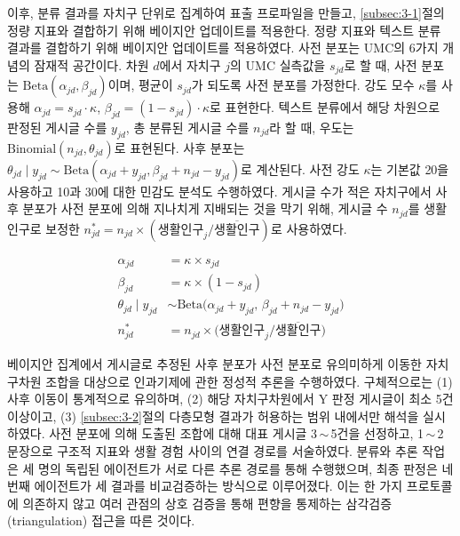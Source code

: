 
이후, 분류 결과를 자치구 단위로 집계하여 표출 프로파일을 만들고, \ref{subsec:3-1}절의 정량 지표와 결합하기 위해 베이지안 업데이트를 적용한다. 정량 지표와 텍스트 분류 결과를 결합하기 위해 베이지안 업데이트를 적용하였다. 사전 분포는 UMC의 6가지 개념의 잠재적 공간이다. 차원 $d$에서 자치구 $j$의 UMC 실측값을 $s_{jd}$로 할 때, 사전 분포는 $\mathrm{Beta}(\alpha_{jd}, \beta_{jd})$이며, 평균이 $s_{jd}$가 되도록 사전 분포를 가정한다. 강도 모수 $\kappa$를 사용해 $\alpha_{jd} = s_{jd}\cdot\kappa$, $\beta_{jd} = (1-s_{jd})\cdot\kappa$로 표현한다. 텍스트 분류에서 해당 차원으로 판정된 게시글 수를 $y_{jd}$, 총 분류된 게시글 수를 $n_{jd}$라 할 때, 우도는 $\mathrm{Binomial}(n_{jd}, \theta_{jd})$로 표현된다. 사후 분포는 $\theta_{jd}\mid y_{jd} \sim \mathrm{Beta}(\alpha_{jd}+y_{jd}, \beta_{jd}+n_{jd}-y_{jd})$로 계산된다. 사전 강도 $\kappa$는 기본값 20을 사용하고 10과 30에 대한 민감도 분석도 수행하였다. 게시글 수가 적은 자치구에서 사후 분포가 사전 분포에 의해 지나치게 지배되는 것을 막기 위해, 게시글 수 $n_{jd}$를 생활인구로 보정한 $n_{jd}^{*} = n_{jd}\times(\text{생활인구}_{j}/\overline{\text{생활인구}})$로 사용하였다.

\begin{align}
\alpha_{jd} &= \kappa \times s_{jd} \label{eq:alpha} \\
\beta_{jd}  &= \kappa \times (1 - s_{jd}) \label{eq:beta} \\
\theta_{jd}\mid y_{jd} &\sim \mathrm{Beta}\bigl(\alpha_{jd}+y_{jd},\, \beta_{jd}+n_{jd}-y_{jd}\bigr) \label{eq:posterior} \\
n_{jd}^{*} &= n_{jd}\times\bigl(\text{생활인구}_{j}/\overline{\text{생활인구}}\bigr) \label{eq:popadj}
\end{align}

베이지안 집계에서 게시글로 추정된 사후 분포가 사전 분포로 유의미하게 이동한 자치구\textperiodcentered{}차원 조합을 대상으로 인과기제에 관한 정성적 추론을 수행하였다. 구체적으로는 (1) 사후 이동이 통계적으로 유의하며, (2) 해당 자치구\textperiodcentered{}차원에서 Y 판정 게시글이 최소 5건 이상이고, (3) \ref{subsec:3-2}절의 다층모형 결과가 허용하는 범위 내에서만 해석을 실시하였다. 사전 분포에 의해 도출된 조합에 대해 대표 게시글 3\,$\sim$\,5건을 선정하고, 1\,$\sim$\,2문장으로 구조적 지표와 생활 경험 사이의 연결 경로를 서술하였다. 분류와 추론 작업은 세 명의 독립된 에이전트가 서로 다른 추론 경로를 통해 수행했으며, 최종 판정은 네 번째 에이전트가 세 결과를 비교\textperiodcentered{}검증하는 방식으로 이루어졌다. 이는 한 가지 프로토콜에 의존하지 않고 여러 관점의 상호 검증을 통해 편향을 통제하는 삼각검증(triangulation) 접근을 따른 것이다.

